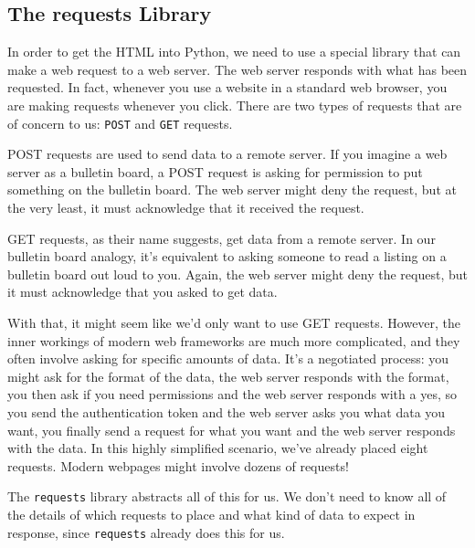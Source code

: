\subsection{The requests Library}
In order to get the HTML into Python, we need to use a special library that can make a web request to a web server. The web server responds with what has been requested. In fact, whenever you use a website in a standard web browser, you are making requests whenever you click. There are two types of requests that are of concern to us: \verb|POST| and \verb|GET| requests.\par
POST requests are used to send data to a remote server. If you imagine a web server as a bulletin board, a POST request is asking for permission to put something on the bulletin board. The web server might deny the request, but at the very least, it must acknowledge that it received the request.\par
GET requests, as their name suggests, get data from a remote server. In our bulletin board analogy, it's equivalent to asking someone to read a listing on a bulletin board out loud to you. Again, the web server might deny the request, but it must acknowledge that you asked to get data.\par
{}
With that, it might seem like we'd only want to use GET requests. However, the inner workings of modern web frameworks are much more complicated, and they often involve asking for specific amounts of data. It's a negotiated process: you might ask for the format of the data, the web server responds with the format, you then ask if you need permissions and the web server responds with a yes, so you send the authentication token and the web server asks you what data you want, you finally send a request for what you want and the web server responds with the data. In this highly simplified scenario, we've already placed eight requests. Modern webpages might involve dozens of requests!\par
The \verb|requests| library abstracts all of this for us. We don't need to know all of the details of which requests to place and what kind of data to expect in response, since \verb|requests| already does this for us.
